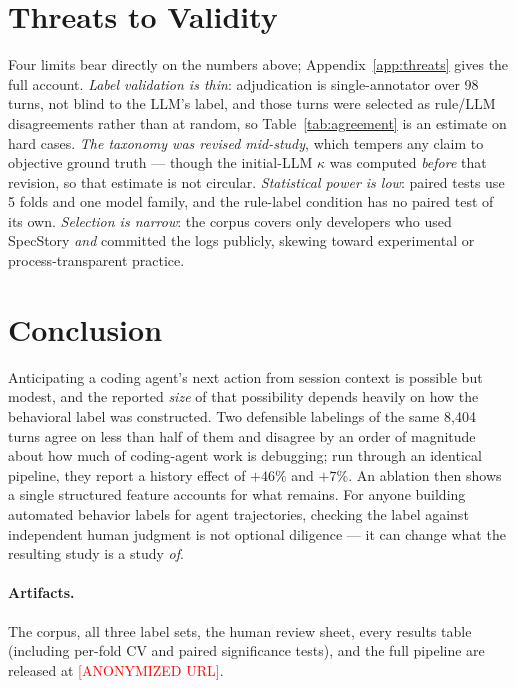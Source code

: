 \documentclass{article}
\begin{document}
\section{Threats to Validity}

Four limits bear directly on the numbers above; Appendix~\ref{app:threats} gives
the full account. \emph{Label validation is thin}: adjudication is
single-annotator over 98 turns, not blind to the LLM's label, and those turns
were selected as rule/LLM disagreements rather than at random, so
Table~\ref{tab:agreement} is an estimate on hard cases. \emph{The taxonomy was
revised mid-study}, which tempers any claim to objective ground truth --- though
the initial-LLM $\kappa$ was computed \emph{before} that revision, so that
estimate is not circular. \emph{Statistical power is low}: paired tests use 5
folds and one model family, and the rule-label condition has no paired test of
its own. \emph{Selection is narrow}: the corpus covers only developers who used
SpecStory \emph{and} committed the logs publicly, skewing toward experimental or
process-transparent practice.

\section{Conclusion}

Anticipating a coding agent's next action from session context is possible but
modest, and the reported \emph{size} of that possibility depends heavily on how
the behavioral label was constructed. Two defensible labelings of the same 8,404
turns agree on less than half of them and disagree by an order of magnitude
about how much of coding-agent work is debugging; run through an identical
pipeline, they report a history effect of $+46\%$ and $+7\%$. An ablation then
shows a single structured feature accounts for what remains. For anyone building
automated behavior labels for agent trajectories, checking the label against
independent human judgment is not optional diligence --- it can change what the
resulting study is a study \emph{of}.

\paragraph{Artifacts.} The corpus, all three label sets, the human review sheet,
every results table (including per-fold CV and paired significance tests), and
the full pipeline are released at \textcolor{red}{[ANONYMIZED URL]}.
\end{document}
